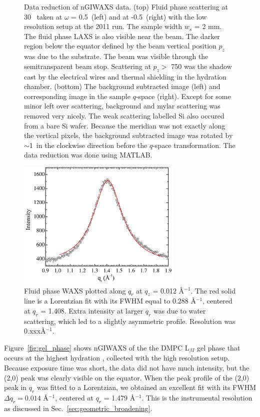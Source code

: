 \begin{figure}[htbp]
  {Data reduction of nGIWAXS data. (top) Fluid phase scattering at
  30 \textcelsius\ taken at $\omega$ = 0.5\textdegree\ (left) 
  and at -0.5\textdegree\ (right) with the low resolution setup at the 
  2011 run. The sample width $w_s$ = 2 mm.
  The fluid phase LAXS is also visible near the beam.  
  The darker region below the equator defined by 
  the beam vertical position $p_z$ was due to the substrate. The beam
  was visible through the semitransparent beam stop.
  Scattering at $p_z >$ 750 was the shadow cast by the electrical wires 
  and thermal shielding in the hydration chamber.
  (bottom) The background subtracted 
  image (left) and corresponding image in the sample $q$-space (right).
  Except for some minor left over scattering, background and mylar scattering was 
  removed very nicely. The weak scattering labelled Si also occured from a bare Si wafer.  
  Because the meridian was not exactly along the vertical
  pixels, the background subtracted image was rotated by $\sim$1\textdegree\
  in the clockwise direction before the $q$-space transformation. The data
  reduction was done using MATLAB.}
  \label{fig:waxs_data_reduction}
\end{figure}

\begin{figure}[htbp]
  \centering
  \includegraphics[width=0.7\textwidth]{figures/ripple/nGIWAXS/fluid_qr}
  \caption{Fluid phase WAXS plotted along $q_r$ at $q_z$ = 0.012 \AA$^{-1}$.
  The red solid line is a Lorentzian fit with its FWHM equal to 0.288 \AA$^{-1}$,
  centered at $q_r$ = 1.408. Extra intensity at larger $q_r$ was due to
  water scattering, which led to a slightly asymmetric profile.  Resolution was 0.xxx\AA$^{-1}$.}
  \label{fig:fluid_qr}
\end{figure}

Figure~\ref{fig:gel_phase} shows nGIWAXS of the the DMPC L$_{\beta I}$ gel phase
that occurs at the highest hydration \cite{ref:Smith88,Tristram-Nagle02},
collected with the high resolution setup. Because exposure time was short,
the data did not have much intensity, but the (2,0) peak was clearly 
visible on the equator.
When the peak profile of the (2,0) peak in $q_r$ was fitted to a Lorentzian, 
we obtained an excellent fit with its FWHM $\Delta q_r = 0.014$ \AA$^{-1}$,
centered at $q_r$ = 1.479 \AA$^{-1}$.
This is the instrumental resolution as discussed in Sec.~\ref{sec:geometric_broadening}. 

